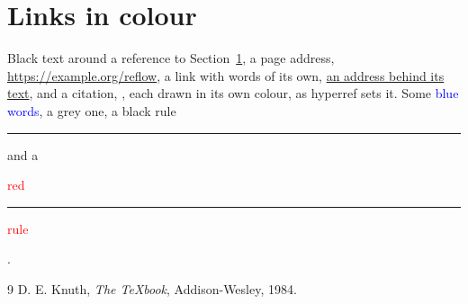 \documentclass{article}
\begin{document}
\section{Links in colour}\label{s:links}
Black text around a reference to Section~\ref{s:links}, a page address,
\url{https://example.org/reflow}, a link with words of its own,
\href{https://example.org/}{an address behind its text}, and a citation,
\cite{knuth}, each drawn in its own colour, as hyperref sets it.
Some \textcolor{blue}{blue words}, a \textcolor{black!60}{grey} one, a black
rule \rule{1cm}{0.6pt} and a \textcolor{red}{red \rule{1cm}{0.6pt} rule}.
\begin{thebibliography}{9}
 D. E. Knuth, \emph{The \TeX book}, Addison-Wesley, 1984.
\end{thebibliography}
\end{document}
